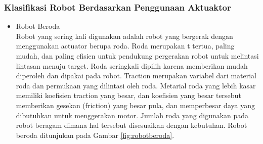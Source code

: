 \subsubsection{Klasifikasi Robot Berdasarkan Penggunaan Aktuaktor}
\begin{itemize}
    \item Robot Beroda\\
    Robot yang sering kali digunakan adalah robot yang bergerak dengan menggunakan actuator berupa roda. Roda merupakan t tertua, paling mudah, dan paling efisien untuk pendukung pergerakan robot untuk melintasi lintasan menuju target. Roda seringkali dipilih karena memberikan mudah diperoleh dan dipakai pada robot. Traction merupakan variabel dari material roda dan permukaan yang dilintasi oleh roda. Metarial roda yang lebih kasar memiliki koefisien traction yang besar, dan koefisien yang besar tersebut memberikan gesekan (friction) yang besar pula, dan memperbesar daya yang dibutuhkan untuk menggerakan motor. Jumlah roda yang digunakan pada robot beragam dimana hal tersebut disesuaikan dengan kebutuhan. Robot beroda ditunjukan pada Gambar \ref{fig:robotberoda}. 


\end{itemize}
